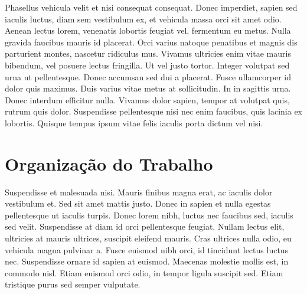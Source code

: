Phasellus vehicula velit et nisi consequat consequat. Donec imperdiet, sapien sed iaculis luctus, diam sem vestibulum ex, et vehicula massa orci sit amet odio. Aenean lectus lorem, venenatis lobortis feugiat vel, fermentum eu metus. Nulla gravida faucibus mauris id placerat. Orci varius natoque penatibus et magnis dis parturient montes, nascetur ridiculus mus. Vivamus ultricies enim vitae mauris bibendum, vel posuere lectus fringilla. Ut vel justo tortor. Integer volutpat sed urna ut pellentesque. Donec accumsan sed dui a placerat. Fusce ullamcorper id dolor quis maximus. Duis varius vitae metus at sollicitudin. In in sagittis urna. Donec interdum efficitur nulla. Vivamus dolor sapien, tempor at volutpat quis, rutrum quis dolor. Suspendisse pellentesque nisi nec enim faucibus, quis lacinia ex lobortis. Quisque tempus ipsum vitae felis iaculis porta dictum vel nisi.

\section{Organização do Trabalho}

Suspendisse et malesuada nisi. Mauris finibus magna erat, ac iaculis dolor vestibulum et. Sed sit amet mattis justo. Donec in sapien et nulla egestas pellentesque ut iaculis turpis. Donec lorem nibh, luctus nec faucibus sed, iaculis sed velit. Suspendisse at diam id orci pellentesque feugiat. Nullam lectus elit, ultricies at mauris ultrices, suscipit eleifend mauris. Cras ultrices nulla odio, eu vehicula magna pulvinar a. Fusce euismod nibh orci, id tincidunt lectus luctus nec. Suspendisse ornare id sapien at euismod. Maecenas molestie mollis est, in commodo nisl. Etiam euismod orci odio, in tempor ligula suscipit sed. Etiam tristique purus sed semper vulputate.